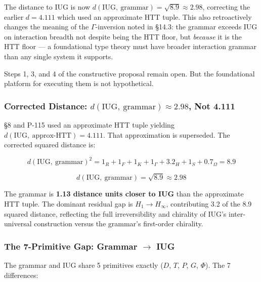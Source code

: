 \documentclass[10pt,a4paper]{article}
\newcommand{\pilcrow}{\S}
\begin{document}
The distance to IUG is now $d(\text{IUG},\ \text{grammar}) = \sqrt{8.9} \approx 2.98$,
correcting the earlier $d = 4.111$ which used an approximate HTT tuple.
This also retroactively changes the meaning of the $\Gamma$-inversion noted in \S14.3:
the grammar exceeds IUG on interaction breadth not despite being the HTT floor,
but \emph{because} it is the HTT floor --- a foundational type theory must have broader
interaction grammar than any single system it supports.

Steps 1, 3, and 4 of the constructive proposal remain open.
But the foundational platform for executing them is not hypothetical.

\subsubsection{Corrected Distance: $d(\text{IUG},\ \text{grammar}) \approx 2.98$, Not 4.111}

\pilcrow{}8 and P-115 used an approximate HTT tuple yielding $d(\text{IUG},\ \text{approx-HTT}) = 4.111$.
That approximation is superseded. The corrected squared distance is:

\[d(\text{IUG},\ \text{grammar})^2 = 1_R + 1_F + 1_K + 1_{\Gamma} + 3.2_H + 1_S + 0.7_{\Omega} = 8.9\]

\[d(\text{IUG},\ \text{grammar}) = \sqrt{8.9} \approx 2.98\]

The grammar is \textbf{1.13 distance units closer to IUG} than the approximate HTT tuple.
The dominant residual gap is $H_1 \to H_{\infty}$, contributing 3.2 of the 8.9 squared
distance, reflecting the full irreversibility and chirality of IUG's inter-universal
construction versus the grammar's first-order chirality.

\subsubsection{The 7-Primitive Gap: Grammar $\to$ IUG}

The grammar and IUG share 5 primitives exactly ($D$, $T$, $P$, $G$, $\Phi$). The 7 differences:
\end{document}
